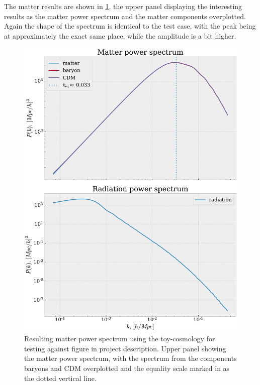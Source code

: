 \documentclass[10pt,a4paper]{article}
\providecommand{\rCDM}
{\ensuremath{
\textrm{CDM}
}
}
\begin{document}
\begin{appendices}
  The matter results are shown in \cref{fig: Matter toy}, the upper panel displaying the interesting results as the matter power spectrum and the matter components overplotted. Again the shape of the spectrum is identical to the test case, with the peak being at approximately the exact same place, while the amplitude is a bit higher. 
  \begin{figure}[ht!]
    \centering
    \includegraphics[scale=0.5]{../figs/comp_PS_toy.pdf}
    \caption{Resulting matter power spectrum using the toy-cosmology for testing against figure in project description. Upper panel showing the matter power spectrum, with the spectrum from the components baryons and \rCDM overplotted and the equality scale marked in as the dotted vertical line.}
    \label{fig: Matter toy}
  \end{figure}

\end{appendices}
\end{document}
